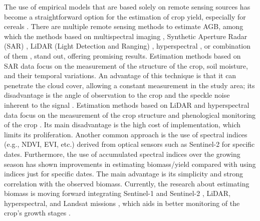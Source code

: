 \documentclass[
  english,
  review,
  number,
  sort,compress,
  authoryear,
  3p]{elsarticle}
\begin{document}
The use of empirical models that are based solely on remote sensing
sources has become a straightforward option for the estimation of crop
yield, especially for cereals \citep{Lischeid2022}. There are multiple
remote sensing methods to estimate AGB, among which the methods based on
multispectral imaging \citep{Marshall2022, Segarra2022}, Synthetic
Aperture Radar (SAR) \citep{Hu2024, Chao2019}, LiDAR (Light Detection
and Ranging) \citep{Bates2021}, hyperspectral \citep{Yue2021}, or
combination of them \citep{Li2024, David2022, Wang2016}, stand out,
offering promising results. Estimation methods based on SAR data focus
on the measurement of the structure of the crop, soil moisture, and
their temporal variations. An advantage of this technique is that it can
penetrate the cloud cover, allowing a constant measurement in the study
area; its disadvantage is the angle of observation to the crop and the
speckle noise inherent to the signal
\citep{Lopes1990, Maghsoudi2012, Moran1997}. Estimation methods based on
LiDAR and hyperspectral data focus on the measurement of the crop
structure and phenological monitoring of the crop
\citep{Brovkina2017, Luo2017, Wang2016}. Its main disadvantage is the
high cost of implementation, which limits its proliferation. Another
common approach is the use of spectral indices (e.g., NDVI, EVI, etc.)
derived from optical sensors such as Sentinel-2 \citep{David2022} for
specific dates. Furthermore, the use of accumulated spectral indices
\citep{PeroniVenancio2020} over the growing season has shown
improvements in estimating biomass/yield compared with using indices
just for specific dates. The main advantage is its simplicity and strong
correlation with the observed biomass. Currently, the research about
estimating biomass is moving forward integrating Sentinel-1 and
Sentinel-2 \citep{Uribeetxebarria2023}, LiDAR, hyperspectral, and
Landsat missions \citep{Zhang2023, He2018}, which aids in better
monitoring of the crop's growth stages \citep{Shen2023}.
\end{document}
